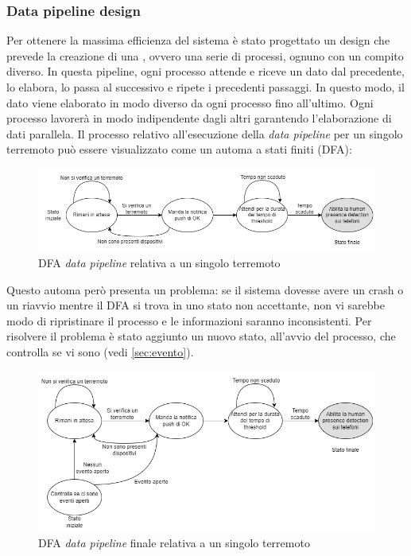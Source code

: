 \documentclass[main.tex]{subfiles}
\begin{document}
\subsubsection{Data pipeline design}
Per ottenere la massima efficienza del sistema è stato progettato un design che prevede la creazione di una , ovvero una serie di processi, ognuno con un compito diverso. In questa pipeline, ogni processo attende e riceve un dato dal precedente, lo elabora, lo passa al successivo e ripete i precedenti passaggi. In questo modo, il dato viene elaborato in modo diverso da ogni processo fino all'ultimo. Ogni processo lavorerà in modo indipendente dagli altri garantendo l'elaborazione di dati parallela.\newline
Il processo relativo all'esecuzione della \emph{data pipeline} per un singolo terremoto può essere visualizzato come un automa a stati finiti (DFA):
\begin{figure}[H]
    \centering
    \includegraphics[width=1\linewidth]{img/Post-Earthquake/Post-EQ-Detection-Diagram-Data pipeline automa.png}
    \caption{DFA \emph{data pipeline} relativa a un singolo terremoto}
    \label{fig:Post-EQ-Detection-Diagram-Data pipeline automa}
\end{figure}
Questo automa però presenta un problema: se il sistema dovesse avere un crash o un riavvio mentre il DFA si trova in uno stato non accettante, non vi sarebbe modo di ripristinare il processo e le informazioni saranno inconsistenti.\newline
Per risolvere il problema è stato aggiunto un nuovo stato, all'avvio del processo, che controlla se vi sono  (vedi \ref{sec:evento}).
\begin{figure}[H]
    \centering
    \includegraphics[width=1\linewidth]{img/Post-Earthquake/Post-EQ-Detection-Diagram-Data pipeline automa final.png}
    \caption{DFA \emph{data pipeline} finale relativa a un singolo terremoto}
    \label{fig:Post-EQ-Detection-Diagram-Data pipeline automa final}
\end{figure}
\end{document}
